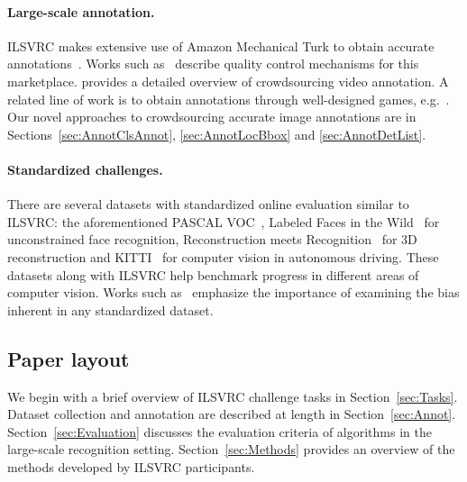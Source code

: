 \paragraph{Large-scale annotation.} ILSVRC makes extensive use of Amazon Mechanical Turk to obtain accurate
annotations~\citep{Sorokin08}. Works such as~\citep{Welinder10,GAL,Vittayakorn11} describe quality control mechanisms for this marketplace. \citep{Vondrick12} provides a detailed overview of crowdsourcing video annotation. A related line of work is to obtain annotations through well-designed games, e.g.~\citep{vonAhn05}. 
Our novel approaches to crowdsourcing accurate image annotations are in Sections~\ref{sec:AnnotClsAnnot}, \ref{sec:AnnotLocBbox} and \ref{sec:AnnotDetList}.

\paragraph{Standardized challenges.} There are several datasets with standardized online evaluation 
similar to ILSVRC: the aforementioned PASCAL VOC~\citep{PASCALVOC}, Labeled Faces in the Wild~\citep{LFW} for unconstrained face recognition, 
Reconstruction meets Recognition~\citep{RR} for 3D reconstruction and KITTI~\citep{KITTI} for computer vision in autonomous driving. These datasets along with ILSVRC help benchmark progress in different areas of computer vision.
Works such as~\citep{Torralba11} emphasize the importance of examining the bias inherent in any standardized dataset.


 
\subsection{Paper layout} 


We begin with a brief overview of ILSVRC challenge tasks in Section~\ref{sec:Tasks}. Dataset
collection and annotation are described at length in Section~\ref{sec:Annot}. 
Section~\ref{sec:Evaluation} discusses the evaluation criteria of algorithms in the large-scale recognition setting. 
Section~\ref{sec:Methods} provides an overview of the methods developed by ILSVRC participants.

